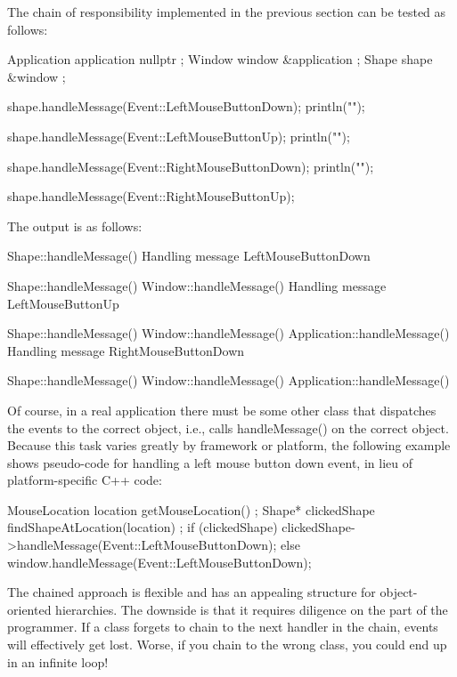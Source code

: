 
The chain of responsibility implemented in the previous section can be tested as follows:

\begin{cpp}
Application application { nullptr };
Window window { &application };
Shape shape { &window };

shape.handleMessage(Event::LeftMouseButtonDown);
println("");

shape.handleMessage(Event::LeftMouseButtonUp);
println("");

shape.handleMessage(Event::RightMouseButtonDown);
println("");

shape.handleMessage(Event::RightMouseButtonUp);
\end{cpp}

The output is as follows:

\begin{shell}
Shape::handleMessage()
    Handling message LeftMouseButtonDown

Shape::handleMessage()
Window::handleMessage()
    Handling message LeftMouseButtonUp

Shape::handleMessage()
Window::handleMessage()
Application::handleMessage()
    Handling message RightMouseButtonDown

Shape::handleMessage()
Window::handleMessage()
Application::handleMessage()
\end{shell}

Of course, in a real application there must be some other class that dispatches the events to the correct object, i.e., calls handleMessage() on the correct object. Because this task varies greatly by framework or platform, the following example shows pseudo-code for handling a left mouse button down event, in lieu of platform-specific C++ code:

\begin{cpp}
MouseLocation location { getMouseLocation() };
Shape* clickedShape { findShapeAtLocation(location) };
if (clickedShape) {
    clickedShape->handleMessage(Event::LeftMouseButtonDown);
} else {
    window.handleMessage(Event::LeftMouseButtonDown);
}
\end{cpp}

The chained approach is flexible and has an appealing structure for object-oriented hierarchies. The downside is that it requires diligence on the part of the programmer. If a class forgets to chain to the next handler in the chain, events will effectively get lost. Worse, if you chain to the wrong class, you could end up in an infinite loop!



















